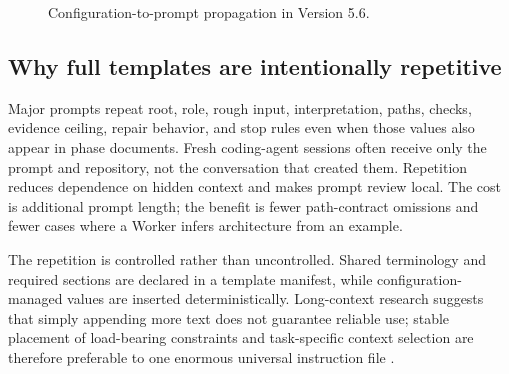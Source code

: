 \documentclass[11pt,a4paper]{article}
\newcommand{\code}[1]{\texttt{\detokenize{#1}}}
\begin{document}
\begin{figure}[H]
\centering
{}
\caption{Configuration-to-prompt propagation in Version 5.6.}
\end{figure}

\subsection{Why full templates are intentionally repetitive}

Major prompts repeat root, role, rough input, interpretation, paths, checks, evidence ceiling, repair behavior, and stop rules even when those values also appear in phase documents. Fresh coding-agent sessions often receive only the prompt and repository, not the conversation that created them. Repetition reduces dependence on hidden context and makes prompt review local. The cost is additional prompt length; the benefit is fewer path-contract omissions and fewer cases where a Worker infers architecture from an example.

The repetition is controlled rather than uncontrolled. Shared terminology and required sections are declared in a template manifest, while configuration-managed values are inserted deterministically. Long-context research suggests that simply appending more text does not guarantee reliable use; stable placement of load-bearing constraints and task-specific context selection are therefore preferable to one enormous universal instruction file \cite{anthropiccontext2025,du2025context,laban2025multiturn}.
\end{document}
